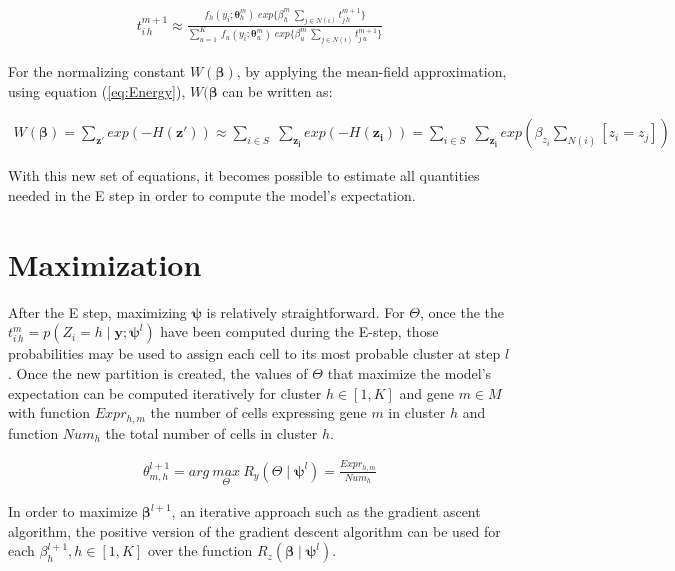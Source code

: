 \begin{align}
\label{eq:fixedpoint}
t_{i\,h}^{m+1} \approx \frac{f_{h} (y_i;\boldsymbol{\theta}_{h}^m)\; exp\{\beta_h^m \: \sum_{j \in N(i)} t_{j\,h}^{m+1}\}}{\sum_{u=1}^K \: f_{u} (y_i;\boldsymbol{\theta}_{u}^m)\; exp\{\beta_u^m \: \sum_{j \in N(i)} t_{j\,u}^{m+1}\}}
\end{align}

For the normalizing constant $W(\boldsymbol{\beta})$, by applying the mean-field approximation, using equation (\ref{eq:Energy}), $W(\boldsymbol{\beta}$ can be written as:

\begin{align*}
W(\boldsymbol{\beta}) = \sum\limits_{\boldsymbol{z'}} exp(-H(\boldsymbol{z'})) \approx \sum\limits_{i \in S}\;\sum\limits_{\boldsymbol{z_i}} exp(-H(\boldsymbol{z_i})) = \sum\limits_{i \in S}\;\sum\limits_{\boldsymbol{z_i}} exp(\beta_{z_i}\sum\limits_{N(i)}[z_i=z_j])
\end{align*}

With this new set of equations, it becomes possible to estimate all quantities needed in the E step in order to compute the model's expectation.\\

\section{Maximization}
After the E step, maximizing $\boldsymbol{\psi}$ is relatively straightforward. For $\Theta$, once the the $t_{i\,h}^{m} = p(Z_i = h \mid \boldsymbol{y};\boldsymbol{\psi}^{l})$ have been computed during the E-step, those probabilities may be used to assign each cell to its most probable cluster at step $l$. Once the new partition is created, the values of $\Theta$ that maximize the model's expectation can be computed iteratively for cluster $h \in [1,K]$ and gene $m \in M$ with function $Expr_{h,m}$ the number of cells expressing gene $m$ in cluster $h$ and function $Num_h$ the total number of cells in cluster $h$.

\begin{align*}
\theta_{m,h}^{l+1} = arg\:\underset{\Theta}{max}\:R_y(\Theta\mid \boldsymbol{\psi}^l) = \frac{Expr_{h,m}}{Num_h}
\end{align*}

In order to maximize $\boldsymbol{\beta}^{l+1}$, an iterative approach such as the gradient ascent algorithm, the positive version of the gradient descent algorithm \cite{burges2005} can be used for each $\beta_h^{l+1}, h \in [1,K]$ over the function $R_z(\boldsymbol{\beta}\mid \boldsymbol{\psi}^l)$. \\


